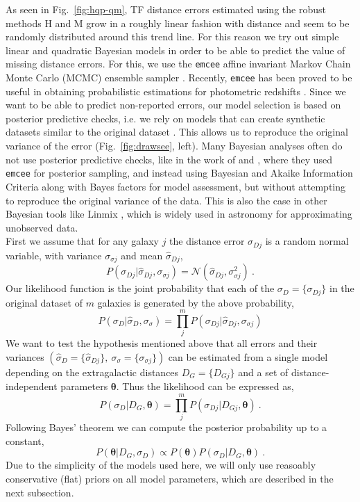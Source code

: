 \documentclass[a4paper,fleqn,usenatbib]{mnras}
\begin{document}
As seen in Fig.~\ref{fig:hqp-qm}, TF distance errors estimated using the robust methods H and M grow in a roughly linear fashion with distance and seem to be randomly distributed around this trend line. For this reason we try out simple linear and quadratic Bayesian models in order to be able to predict the value of missing distance errors. For this, we use the \texttt{emcee} affine invariant Markov Chain Monte Carlo (MCMC) ensemble sampler \citep{emcee}. Recently, \texttt{emcee} has been proved to be useful in obtaining probabilistic estimations for photometric redshifts \citet{photred1,photred2}. Since we want to be able to predict non-reported errors, our model selection is based on posterior predictive checks, i.e. we rely on models that can create synthetic datasets similar to the original dataset \citep{gelmanppd}. This allows us to reproduce the original variance of the error (Fig.~\ref{fig:drawsee}, left). Many Bayesian analyses often do not use posterior predictive checks, like in the work of \citet{propprob2018} and \citet{bayesh}, where they used \texttt{emcee} for posterior sampling, and instead using Bayesian and Akaike Information Criteria along with Bayes factors for model assessment, but without attempting to reproduce the original variance of the data. This is also the case in other Bayesian tools like Linmix  \citep{gmastro}, which is widely used in astronomy for approximating unobserved data.  \\

First we assume that for any galaxy $j$ the distance error $\sigma_{Dj}$ is a random normal variable, with variance $\sigma_{\sigma j}$ and mean $\hat{\sigma}_{Dj}$, 
\begin{equation}
P(\sigma_{Dj}|\hat{\sigma}_{Dj},\sigma_{\sigma j})=\mathcal{N}(\hat{\sigma}_{Dj},\sigma_{\sigma j}^2)\ .
	\label{eq:prob}
\end{equation}
Our likelihood function is the joint probability that each of the $\sigma_D=\{\sigma_{Dj}\}$ in the original dataset of $m$ galaxies is generated by the above probability,  
\begin{equation}
 P(\sigma_{D}|\hat{\sigma}_{D},\sigma_{\sigma})=\prod_j^mP(\sigma_{Dj}|\hat{\sigma}_{Dj},\sigma_{\sigma j})
\end{equation}
We want to test the hypothesis mentioned above that all errors and their variances $(\hat{\sigma}_D=\{\hat{\sigma}_{Dj}\},\ \sigma_\sigma=\{\sigma_{\sigma j}\})$ can be estimated from a single model depending on the extragalactic distances $D_G=\{D_{Gj}\}$ and a set of distance-independent parameters $\pmb{\theta}$. Thus the likelihood can be expressed as,
\[P(\sigma_D|D_G,\pmb{\theta})=\prod_j^mP(\sigma_{Dj}|D_{Gj},\pmb{\theta})\ .\]
Following Bayes' theorem we can compute the posterior probability up to a constant,
\begin{equation}
P(\pmb{\theta}|D_G,\sigma_D)\propto P(\pmb{\theta})P(\sigma_D|D_G,\pmb{\theta})\ .
	\label{eq:ppd}
\end{equation}
Due to the simplicity of the models used here, we will only use reasoably conservative (flat) priors on all model parameters, which are described in the next subsection.\\
\end{document}
